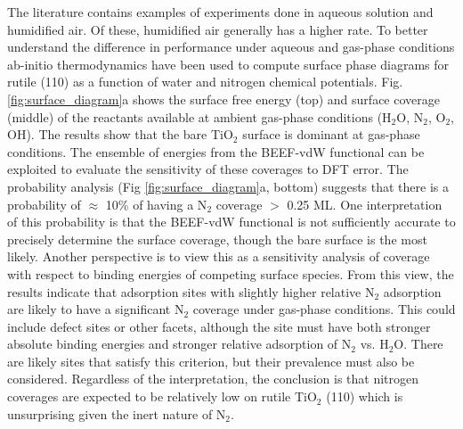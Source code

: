 \documentclass[journal=ascecg,manuscript=article,articletitle=true]{achemso}
\begin{document}
The literature contains examples of experiments done in aqueous solution\cite{Augugliaro_1982,Hirakawa_2017} and humidified air\cite{Schrauzer_1977,Schrauzer_1983}. Of these, humidified air generally has a higher rate.\cite{Schrauzer_2011} To better understand the difference in performance under aqueous and gas-phase conditions ab-initio thermodynamics \cite{Reuter_2001} have been used to compute surface phase diagrams for rutile (110) as a function of water and nitrogen chemical potentials. Fig. \ref{fig:surface_diagram}a shows the surface free energy (top) and surface coverage (middle) of the reactants available at ambient gas-phase conditions (H$_2$O, N$_2$, O$_2$, OH). The results show that the bare TiO$_2$ surface is dominant at gas-phase conditions. The ensemble of energies from the BEEF-vdW functional can be exploited to evaluate the sensitivity of these coverages to DFT error. The probability analysis (Fig \ref{fig:surface_diagram}a, bottom) suggests that there is a probability of $\approx$ 10\% of having a N$_2$ coverage $>$ 0.25 ML. One interpretation of this probability is that the BEEF-vdW functional is not sufficiently accurate to precisely determine the surface coverage, though the bare surface is the most likely. Another perspective is to view this as a sensitivity analysis of coverage with respect to binding energies of competing surface species. From this view, the results indicate that adsorption sites with slightly higher relative N$_2$ adsorption are likely to have a significant N$_2$ coverage under gas-phase conditions. This could include defect sites or other facets,  although the site must have both stronger absolute binding energies and stronger relative adsorption of N$_2$ vs. H$_2$O. There are likely sites that satisfy this criterion, but their prevalence must also be considered. Regardless of the interpretation, the conclusion is that nitrogen coverages are expected to be relatively low on rutile TiO$_2$ (110) which is unsurprising given the inert nature of N$_2$.
\end{document}
